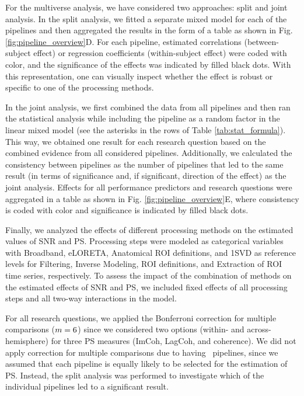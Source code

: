 \medskip

For the multiverse analysis, we have considered two approaches: split and joint analysis. In the split analysis, we fitted a separate mixed model for each of the pipelines and then aggregated the results in the form of a table as shown in Fig. \ref{fig:pipeline_overview}D. For each pipeline, estimated correlations (between-subject effect) or regression coefficients (within-subject effect) were coded with color, and the significance of the effects was indicated by filled black dots. With this representation, one can visually inspect whether the effect is robust or specific to one of the processing methods.

\medskip

In the joint analysis, we first combined the data from all pipelines and then ran the statistical analysis while including the pipeline as a random factor in the linear mixed model (see the asterisks in the rows of Table \ref{tab:stat_formula}). This way, we obtained one result for each research question based on the combined evidence from all considered pipelines. Additionally, we calculated the consistency between pipelines as the number of pipelines that led to the same result (in terms of significance and, if significant, direction of the effect) as the joint analysis. Effects for all performance predictors and research questions were aggregated in a table as shown in Fig. \ref{fig:pipeline_overview}E, where consistency is coded with color and significance is indicated by filled black dots. 

\medskip

Finally, we analyzed the effects of different processing methods on the estimated values of SNR and PS. Processing steps were modeled as categorical variables with Broadband, eLORETA, Anatomical ROI definitions, and 1SVD as reference levels for Filtering, Inverse Modeling, ROI definitions, and Extraction of ROI time series, respectively. To assess the impact of the combination of methods on the estimated effects of SNR and PS, we included fixed effects of all processing steps and all two-way interactions in the model.

\medskip

For all research questions, we applied the Bonferroni correction for multiple comparisons ($m=6$) since we considered two options (within- and across-hemisphere) for three PS measures (ImCoh, LagCoh, and coherence). We did not apply correction for multiple comparisons due to having \numPipelines~pipelines, since we assumed that each pipeline is equally likely to be selected for the estimation of PS. Instead, the split analysis was performed to investigate which of the individual pipelines led to a significant result.
